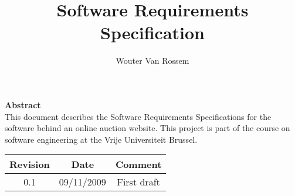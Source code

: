 \documentclass{report}
\begin{document}
\title{Software Requirements Specification}
\author{Wouter Van Rossem}

\maketitle
\begin{center}
	\textbf{Abstract} \\
	This document describes the Software Requirements Specifications for
	the software behind an online auction website. This project is part of 
	the course on software engineering at the Vrije Universiteit Brussel.
	\bigskip 
\begin{tabular}{|c|c|c|}
	\hline  \textbf{Revision} & \textbf{Date} & \textbf{Comment} \\ 
	\hline 0.1 & 09/11/2009 & First draft \\ 
	\hline 
\end{tabular} 
\end{center}
\tableofcontents








\end{document}
